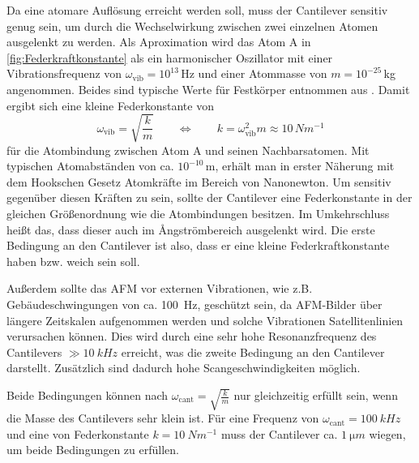     Da eine atomare Auflösung erreicht werden soll, muss der Cantilever sensitiv genug sein, um durch die Wechselwirkung zwischen zwei einzelnen Atomen ausgelenkt zu werden.
    Als Aproximation wird das Atom A in \autoref{fig:Federkraftkonstante} als ein harmonischer Oszillator mit einer Vibrationsfrequenz von $\omega_{\mathrm{vib}} = 10^{13}\,$Hz und einer Atommasse von $m = 10^{-25}\,$kg angenommen.
    Beides sind typische Werte für Festkörper entnommen aus \cite{wiesendanger}.
    Damit ergibt sich eine kleine Federkonstante von
    \begin{equation}
        \omega_{\mathrm{vib}} = \sqrt{\frac{k}{m}} \qquad \Leftrightarrow \qquad k = \omega_{\mathrm{vib}}^2 m \approx 10\,\si{Nm^{-1}}
    \end{equation}
    für die Atombindung zwischen Atom A und seinen Nachbarsatomen.
    Mit typischen Atomabständen von ca. $10^{-10}\,$m, erhält man in erster Näherung mit dem Hookschen Gesetz Atomkräfte im Bereich von Nanonewton.
    Um sensitiv gegenüber diesen Kräften zu sein, sollte der Cantilever eine Federkonstante in der gleichen Größenordnung wie die Atombindungen besitzen.
    Im Umkehrschluss heißt das, dass dieser auch im \r{A}ngströmbereich ausgelenkt wird.
    Die erste Bedingung an den Cantilever ist also, dass er eine kleine Federkraftkonstante haben bzw. weich sein soll.

    Außerdem sollte das AFM vor externen Vibrationen, wie z.B. Gebäudeschwingungen von ca. \SI{100}{Hz}, geschützt sein, da AFM-Bilder über längere Zeitskalen aufgenommen werden und solche Vibrationen Satellitenlinien verursachen können.
    Dies wird durch eine sehr hohe Resonanzfrequenz des Cantilevers $\gg \SI{10}{kHz}$ erreicht, was die zweite Bedingung an den Cantilever darstellt.
    Zusätzlich sind dadurch hohe Scangeschwindigkeiten möglich.
    
    Beide Bedingungen können nach $\omega_{\mathrm{cant}} = \sqrt{\frac{k}{m}}$ nur gleichzeitig erfüllt sein, wenn die Masse des Cantilevers sehr klein ist.
    Für eine Frequenz von $\omega_{\mathrm{cant}} = \SI{100}{kHz}$ und eine von Federkonstante $k = \SI{10}{Nm^{-1}}$ muss der Cantilever ca. $\SI{1}{\micro m}$ wiegen, um beide Bedingungen zu erfüllen.

